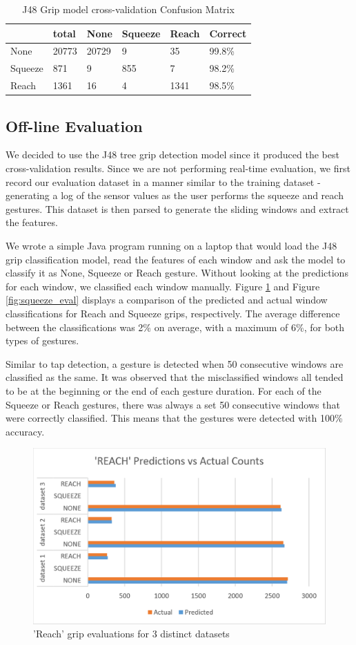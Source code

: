 \begin{table}[!t]
\caption{J48 Grip model cross-validation Confusion Matrix}
\label{tbl-Grip Model J48}
\begin{tabular}{|l|l|l|l|l|l|}
\hline
        & total & None  & Squeeze & Reach & Correct \\ \hline \hline
None    & 20773 & 20729 & 9       & 35    & 99.8\%  \\ \hline
Squeeze & 871   & 9     & 855     & 7     & 98.2\%  \\ \hline
Reach   & 1361  & 16    & 4       & 1341  & 98.5\%  \\ \hline
\end{tabular}
\end{table}


\subsection{Off-line Evaluation}
We decided to use the J48 tree grip detection model since it produced the best cross-validation results. Since we are not performing real-time evaluation, we first record our evaluation dataset in a manner similar to the training dataset - generating a log of the sensor values as the user performs the squeeze and reach gestures. This dataset is then parsed to generate the sliding windows and extract the features. 
\par
We wrote a simple Java program running on a laptop that would load the J48 grip classification model, read the features of each window and ask the model to classify it as None, Squeeze or Reach gesture. Without looking at the predictions for each window, we classified each window manually. Figure \ref{fig:reach_eval} and Figure \ref{fig:squeeze_eval} displays a comparison of the predicted and actual window classifications for Reach and Squeeze grips, respectively. The average difference between the classifications was 2\% on average, with a maximum of 6\%, for both types of gestures.
\par
Similar to tap detection, a gesture is detected when 50 consecutive windows are classified as the same. It was observed that the misclassified windows all tended to be at the beginning or the end of each gesture duration. For each of the Squeeze or Reach gestures, there was always a set 50 consecutive windows that were correctly classified. This means that the gestures were detected with 100\% accuracy.

\begin{figure}[h]
\includegraphics[width=.45\textwidth]{reach_eval.png}
\caption{'Reach' grip evaluations for 3 distinct datasets}
\label{fig:reach_eval}
\end{figure}


